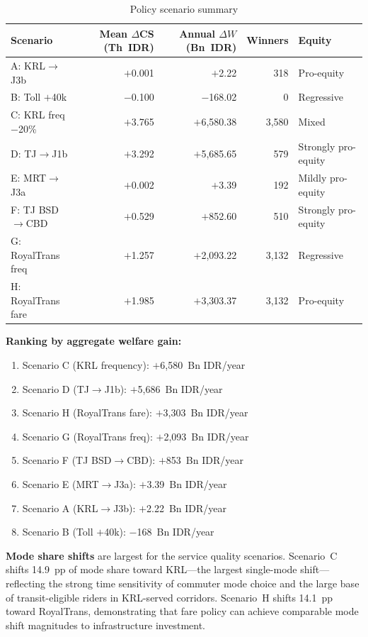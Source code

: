 \documentclass[12pt,a4paper]{article}
\begin{document}
\begin{table}[ht]
\centering
\caption{Policy scenario summary}
\label{tab:scenarios}
\begin{tabular}{lrrrl}
\toprule
Scenario & Mean $\Delta$CS (Th~IDR) & Annual $\Delta W$ (Bn~IDR) & Winners & Equity \\
\midrule
A: KRL$\to$J3b          & $+$0.001 & $+$2.22      & 318   & Pro-equity \\
B: Toll $+$40k          & $-$0.100 & $-$168.02    & 0     & Regressive \\
C: KRL freq $-$20\%     & $+$3.765 & $+$6,580.38  & 3,580 & Mixed \\
D: TJ$\to$J1b           & $+$3.292 & $+$5,685.65  & 579   & Strongly pro-equity \\
E: MRT$\to$J3a          & $+$0.002 & $+$3.39      & 192   & Mildly pro-equity \\
F: TJ BSD$\to$CBD       & $+$0.529 & $+$852.60    & 510   & Strongly pro-equity \\
G: RoyalTrans freq      & $+$1.257 & $+$2,093.22  & 3,132 & Regressive \\
H: RoyalTrans fare      & $+$1.985 & $+$3,303.37  & 3,132 & Pro-equity \\
\bottomrule
\end{tabular}
\end{table}

\textbf{Ranking by aggregate welfare gain:}
\begin{enumerate}[nosep]
    \item Scenario C (KRL frequency): $+$6,580~Bn IDR/year
    \item Scenario D (TJ$\to$J1b): $+$5,686~Bn IDR/year
    \item Scenario H (RoyalTrans fare): $+$3,303~Bn IDR/year
    \item Scenario G (RoyalTrans freq): $+$2,093~Bn IDR/year
    \item Scenario F (TJ BSD$\to$CBD): $+$853~Bn IDR/year
    \item Scenario E (MRT$\to$J3a): $+$3.39~Bn IDR/year
    \item Scenario A (KRL$\to$J3b): $+$2.22~Bn IDR/year
    \item Scenario B (Toll $+$40k): $-$168~Bn IDR/year
\end{enumerate}

\textbf{Mode share shifts} are largest for the service quality scenarios. Scenario~C shifts 14.9~pp of mode share toward KRL---the largest single-mode shift---reflecting the strong time sensitivity of commuter mode choice and the large base of transit-eligible riders in KRL-served corridors. Scenario~H shifts 14.1~pp toward RoyalTrans, demonstrating that fare policy can achieve comparable mode shift magnitudes to infrastructure investment.
\end{document}
